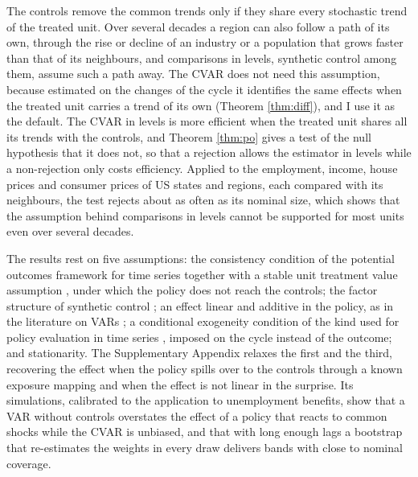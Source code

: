 \documentclass[12pt,a4paper]{article}
\theoremstyle{definition}
\theoremstyle{definition}\newtheorem{example}{Example}
\theoremstyle{definition}\newtheorem{definition}{Definition}
\begin{document}
The controls remove the common trends only if they share every stochastic trend of the treated unit. Over several decades a region can also follow a path of its own, through the rise or decline of an industry or a population that grows faster than that of its neighbours, and comparisons in levels, synthetic control among them, assume such a path away. The CVAR does not need this assumption, because estimated on the changes of the cycle it identifies the same effects when the treated unit carries a trend of its own (Theorem \ref{thm:diff}), and I use it as the default. The CVAR in levels is more efficient when the treated unit shares all its trends with the controls, and Theorem \ref{thm:po} gives a test of the null hypothesis that it does not, so that a rejection allows the estimator in levels while a non-rejection only costs efficiency. Applied to the employment, income, house prices and consumer prices of US states and regions, each compared with its neighbours, the test rejects about as often as its nominal size, which shows that the assumption behind comparisons in levels cannot be supported for most units even over several decades.

The results rest on five assumptions: the consistency condition of the potential outcomes framework for time series \citep{RambachanSheppard2021} together with a stable unit treatment value assumption \citep{Rubin1980}, under which the policy does not reach the controls; the factor structure of synthetic control \citep{Abadie2010}; an effect linear and additive in the policy, as in the literature on VARs \citep{KilianLutkepohl2017}; a conditional exogeneity condition of the kind used for policy evaluation in time series \citep{AngristJordaKuersteiner2018}, imposed on the cycle instead of the outcome; and stationarity. The Supplementary Appendix relaxes the first and the third, recovering the effect when the policy spills over to the controls through a known exposure mapping and when the effect is not linear in the surprise. Its simulations, calibrated to the application to unemployment benefits, show that a VAR without controls overstates the effect of a policy that reacts to common shocks while the CVAR is unbiased, and that with long enough lags a bootstrap that re-estimates the weights in every draw delivers bands with close to nominal coverage.
\end{document}
